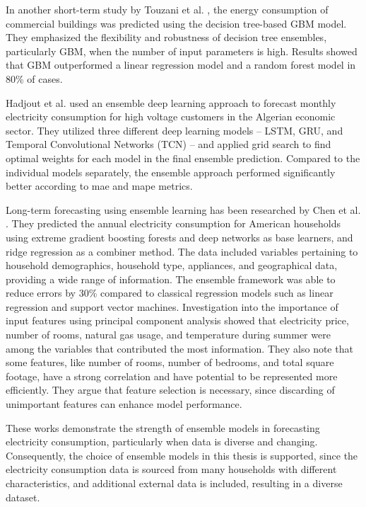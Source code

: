 In another short-term study by Touzani et al. \cite{touzani_gradient_2018}, the energy consumption of commercial buildings was predicted using the decision tree-based GBM model. They emphasized the flexibility and robustness of decision tree ensembles, particularly GBM, when the number of input parameters is high. Results showed that GBM outperformed a linear regression model and a random forest model in 80\% of cases.

Hadjout et al. \cite{hadjout_electricity_2022} used an ensemble deep learning approach to forecast monthly electricity consumption for high voltage customers in the Algerian economic sector. They utilized three different deep learning models – LSTM, GRU, and Temporal Convolutional Networks (TCN) – and applied grid search to find optimal weights for each model in the final ensemble prediction. Compared to the individual models separately, the ensemble approach performed significantly better according to \ac{mae} and \ac{mape} metrics.

Long-term forecasting using ensemble learning has been researched by Chen et al. \cite{chen_novel_2018}. They predicted the annual electricity consumption for American households using extreme gradient boosting forests and deep networks as base learners, and ridge regression as a combiner method. The data included variables pertaining to household demographics, household type, appliances, and geographical data, providing a wide range of information. The ensemble framework was able to reduce errors by 30\% compared to classical regression models such as linear regression and support vector machines. Investigation into the importance of input features using principal component analysis showed that electricity price, number of rooms, natural gas usage, and temperature during summer were among the variables that contributed the most information. They also note that some features, like number of rooms, number of bedrooms, and total square footage, have a strong correlation and have potential to be represented more efficiently. They argue that feature selection is necessary, since discarding of unimportant features can enhance model performance.

These works demonstrate the strength of ensemble models in forecasting electricity consumption, particularly when data is diverse and changing. Consequently, the choice of ensemble models in this thesis is supported, since the electricity consumption data is sourced from many households with different characteristics, and additional external data is included, resulting in a diverse dataset.

